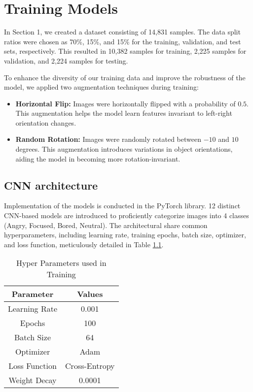 \chapter{Training Models}

In Section 1, we created a dataset consisting of 14,831 samples. The data split ratios were chosen as 70\%, 15\%, and 15\% for the training, validation, and test sets, respectively. This resulted in 10,382 samples for training, 2,225 samples for validation, and 2,224 samples for testing.

To enhance the diversity of our training data and improve the robustness of the model, we applied two augmentation techniques during training:

\begin{itemize}
	\item \textbf{Horizontal Flip:} Images were horizontally flipped with a probability of $0.5$. This augmentation helps the model learn features invariant to left-right orientation changes.
	
	\item \textbf{Random Rotation:} Images were randomly rotated between $-10$ and $10$ degrees. This augmentation introduces variations in object orientations, aiding the model in becoming more rotation-invariant.
\end{itemize}

\section{CNN architecture}

Implementation of the models is conducted in the PyTorch library\cite{torch}. 12 distinct CNN-based models are introduced to proficiently categorize images into 4 classes (Angry, Focused, Bored, Neutral). The architectural share common hyperparameters, including learning rate, training epochs, batch size, optimizer, and loss function, meticulously detailed in Table \ref{tab:hyper}.

\begin{table}[h]
	
	\centering
	\caption{Hyper Parameters used in Training}
	\begin{tabular}{|c|c|}
		\hline
		Parameter        & Values      \\
		\hline
		Learning Rate    & 0.001       \\
		Epochs           & 100         \\
		Batch Size       & 64          \\
		Optimizer        & Adam        \\
		Loss Function    & Cross-Entropy\\
		Weight Decay     & 0.0001      \\
		\hline
	\end{tabular}
	\label{tab:hyper}
\end{table}

